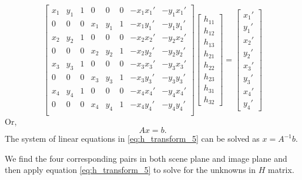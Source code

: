 \documentclass{article}
\begin{document}
\begin{equation}
	\begin{bmatrix}
		x_1 & y_1 & 1 & 0 & 0 & 0 & -x_1x_1' & -y_1x_1'\\
		0 & 0 & 0 & x_1 & y_1 & 1 & -x_1y_1' & -y_1y_1'\\
		x_2 & y_2 & 1 & 0 & 0 & 0 & -x_2x_2' & -y_2x_2'\\
		0 & 0 & 0 & x_2 & y_2 & 1 & -x_2y_2' & -y_2y_2'\\
		x_3 & y_3 & 1 & 0 & 0 & 0 & -x_3x_3' & -y_3x_3'\\
		0 & 0 & 0 & x_3 & y_3 & 1 & -x_3y_3' & -y_3y_3'\\
		x_4 & y_4 & 1 & 0 & 0 & 0 & -x_4x_4' & -y_4x_4'\\
		0 & 0 & 0 & x_4 & y_4 & 1 & -x_4y_4' & -y_4y_4'\\
	\end{bmatrix}
	\begin{bmatrix}
		h_{11} \\ h_{12} \\ h_{13} \\ h_{21} \\ h_{22} \\ h_{23} \\ h_{31} \\ h_{32}
	\end{bmatrix} = 
	\begin{bmatrix}
		x_1' \\ y_1' \\ x_2' \\ y_2' \\ x_3' \\ y_3' \\ x_4' \\y_4'
	\end{bmatrix}
	\label{eq:h_transform_5}
\end{equation}
Or,
\begin{equation}
	Ax = b.
\end{equation}
The system of linear equations in \ref{eq:h_transform_5} can be solved as $x = A^{-1}b$.

We find the four corresponding pairs in both scene plane and image plane and then apply equation \ref{eq:h_transform_5} to solve for the unknowns in $H$ matrix.
\end{document}
